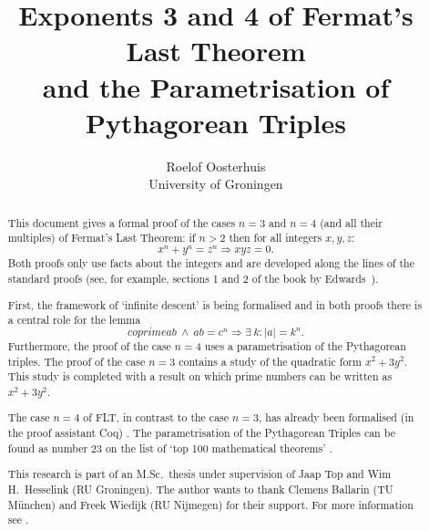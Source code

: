 \documentclass[11pt,a4paper,twoside]{article}
\begin{document}
\title{Exponents 3 and 4 of Fermat's Last Theorem \\ and the Parametrisation of Pythagorean Triples}
\author{Roelof Oosterhuis\\University of Groningen}
\maketitle

\begin{abstract}
This document gives a formal proof of the cases $n=3$ and $n=4$ (and
all their multiples) of Fermat's Last Theorem: if $n>2$ then for all
integers $x,y,z$:
\[ x^n + y^n = z^n \Longrightarrow xyz=0.\]
Both proofs only use facts about the integers and are developed along
the lines of the standard proofs (see, for example, sections 1 and 2
of the book by Edwards~\cite{Edwards}).

First, the framework of `infinite descent' is being formalised and in
both proofs there is a central role for the lemma
\[ coprime a b ~\land~ ab=c^n \Longrightarrow \exists ~k: |a| =k^n. \]
Furthermore, the proof of the case $n=4$ uses a parametrisation of the
Pythagorean triples. The proof of the case $n=3$ contains a study of
the quadratic form $x^2 + 3y^2$. This study is completed with a result
on which prime numbers can be written as $x^2+3y^2$.

The case $n=4$ of FLT, in contrast to the case $n=3$, has already been
formalised (in the proof assistant Coq) \cite{DelahayeM}. The
parametrisation of the Pythagorean Triples can be found as number 23
on the list of `top 100 mathematical theorems' \cite{Wiedijk100}.

This research is part of an M.Sc.~thesis under supervision of Jaap Top
and Wim H.~Hesselink (RU Groningen). The author wants to thank Clemens
Ballarin (TU M\"unchen) and Freek Wiedijk (RU Nijmegen) for their
support. For more information see \cite{Oosterhuis-MSc}.
\end{abstract}
\thispagestyle{empty}
\clearpage

\tableofcontents
{}

\clearpage





\end{document}

